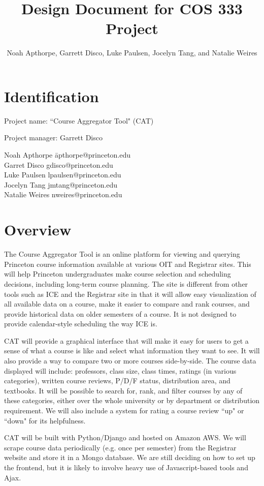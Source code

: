 \documentclass[11pt]{article}
\title{ Design Document for COS 333 Project }
\author{Noah Apthorpe, Garrett Disco, Luke Paulsen, Jocelyn Tang, and Natalie Weires}
\begin{document}
\maketitle

\section{Identification}
\par Project name: ``Course Aggregator Tool" (CAT)
\par Project manager: Garrett Disco
\begin{tabbing}
Noah Apthorpe\; \= apthorpe@princeton.edu \\
Garret Disco \> gdisco@princeton.edu \\
Luke Paulsen \> lpaulsen@princeton.edu \\
Jocelyn Tang \> jmtang@princeton.edu \\
Natalie Weires \> nweires@princeton.edu
\end{tabbing}

\section{Overview}
\par The Course Aggregator Tool is an online platform for viewing and querying Princeton course information available at various OIT and Registrar sites. This will help Princeton undergraduates make course selection and scheduling decisions, including long-term course planning. The site is different from other tools such as ICE and the Registrar site in that it will allow easy visualization of all available data on a course, make it easier to compare and rank courses, and provide historical data on older semesters of a course. It is not designed to provide calendar-style scheduling the way ICE is.
\par CAT will provide a graphical interface that will make it easy for users to get a sense of what a course is like and select what information they want to see. It will also provide a way to compare two or more courses side-by-side. The course data displayed will include: professors, class size, class times, ratings (in various categories), written course reviews, P/D/F status, distribution area, and textbooks. It will be possible to search for, rank, and filter courses by any of these categories, either over the whole university or by department or distribution requirement. We will also include a system for rating a course review ``up" or ``down" for its helpfulness.
\par CAT will be built with Python/Django and hosted on Amazon AWS. We will scrape course data periodically (e.g. once per semester) from the Registrar website and store it in a Mongo database. We are still deciding on how to set up the frontend, but it is likely to involve heavy use of Javascript-based tools and Ajax.
\end{document}
